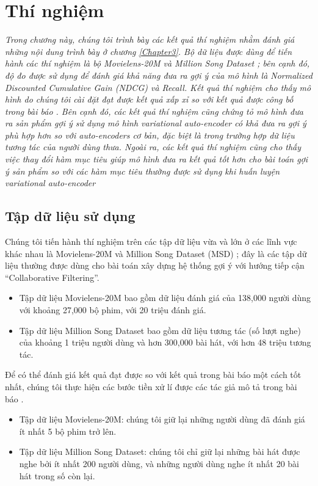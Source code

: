\chapter{Thí nghiệm}
\label{Chapter4}
\graphicspath{{Chapter4/Chapter4Figs}}
\textit{Trong chương này, chúng tôi trình bày các kết quả thí nghiệm nhằm đánh giá những nội dung trình bày ở chương \ref{Chapter3}. Bộ dữ liệu được dùng để tiến hành các thí nghiệm là bộ Movielens-20M \cite{Ml20M} và Million Song Dataset \cite{MSD}; bên cạnh đó, độ đo được sử dụng để đánh giá khả năng đưa ra gợi ý của mô hình là Normalized Discounted Cumulative Gain (NDCG) và  Recall. Kết quả thí nghiệm cho thấy mô hình do chúng tôi cài đặt đạt được kết quả xấp xỉ so với kết quả được công bố trong bài báo \cite{mvae}. Bên cạnh đó, các kết quả thí nghiệm cũng chứng tỏ mô hình đưa ra sản phẩm gợi ý sử dụng mô hình variational auto-encoder có khả đưa ra gợi ý phù hợp hơn so với auto-encoders cơ bản, đặc biệt là trong trường hợp dữ liệu tương tác của người dùng thưa. Ngoài ra, các kết quả thí nghiệm cũng cho thấy việc thay đổi hàm mục tiêu giúp mô hình đưa ra kết quả tốt hơn cho bài toán gợi ý sản phẩm so với các hàm mục tiêu thường được sử dụng khi huấn luyện variational auto-encoder}


\section{Tập dữ liệu sử dụng}
\label{chap4sec1}
Chúng tôi tiến hành thí nghiệm trên các tập dữ liệu vừa và lớn ở các lĩnh vực khác nhau là Movielens-20M \cite{Ml20M} 
và Million Song Dataset (MSD) \cite{MSD}; đây là các tập dữ liệu thường được dùng cho bài toán xây dựng hệ thống gợi ý
với hướng tiếp cận ``Collaborative Filtering''. 
\begin{itemize}
    \item Tập dữ liệu Movielens-20M bao gồm dữ liệu đánh giá của 138,000 người dùng với khoảng 27,000 bộ phim,
    với 20 triệu đánh giá.
    \item Tập dữ liệu Million Song Dataset bao gồm dữ liệu tương tác (số lượt nghe) của khoảng 1 triệu người dùng và hơn 300,000 bài hát, với hơn 48 triệu tương tác.
\end{itemize}

Để có thể đánh giá kết quả đạt được so với kết quả trong bài báo \cite{mvae} một cách tốt nhất,
chúng tôi thực hiện các bước tiền xử lí được các tác giả mô tả trong bài báo \cite{mvae}.
\begin{itemize}
    \item Tập dữ liệu Movielens-20M: chúng tôi giữ lại những người dùng đã đánh giá ít nhất 5 bộ phim trở lên. 
    \item Tập dữ liệu Million Song Dataset: chúng tôi chỉ giữ lại những bài hát được nghe bởi ít nhất 200 người dùng, và những người dùng nghe ít nhất 20 bài hát trong số còn lại.
\end{itemize}

